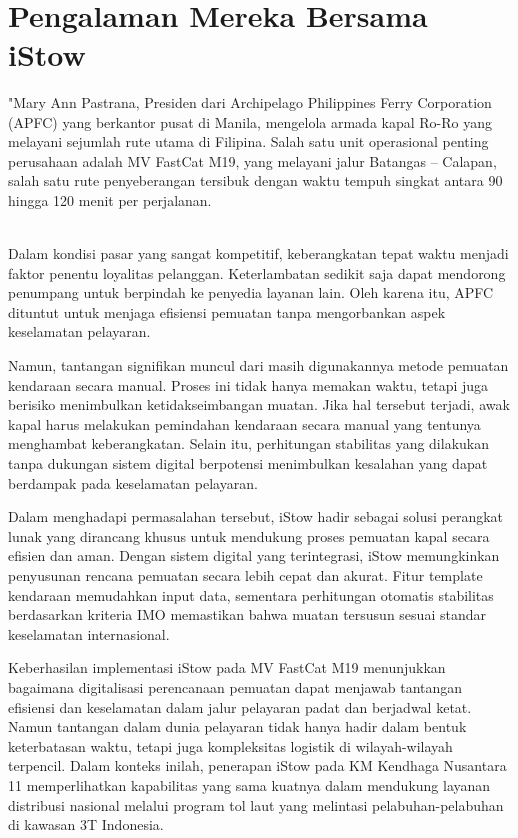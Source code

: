 {
\\
}

\section{Pengalaman Mereka Bersama iStow}
\label{sec:iStow-sebagai-solusi}

"Mary Ann Pastrana, Presiden dari Archipelago Philippines Ferry Corporation (APFC) yang berkantor pusat di Manila, mengelola armada kapal Ro-Ro yang melayani sejumlah rute utama di Filipina. Salah satu unit operasional penting perusahaan adalah MV FastCat M19, yang melayani jalur Batangas – Calapan, salah satu rute penyeberangan tersibuk dengan waktu tempuh singkat antara 90 hingga 120 menit per perjalanan.\\

{
\\
}

Dalam kondisi pasar yang sangat kompetitif, keberangkatan tepat waktu menjadi faktor penentu loyalitas pelanggan. Keterlambatan sedikit saja dapat mendorong penumpang untuk berpindah ke penyedia layanan lain. Oleh karena itu, APFC dituntut untuk menjaga efisiensi pemuatan tanpa mengorbankan aspek keselamatan pelayaran.

Namun, tantangan signifikan muncul dari masih digunakannya metode pemuatan kendaraan secara manual. Proses ini tidak hanya memakan waktu, tetapi juga berisiko menimbulkan ketidakseimbangan muatan. Jika hal tersebut terjadi, awak kapal harus melakukan pemindahan kendaraan secara manual yang tentunya menghambat keberangkatan. Selain itu, perhitungan stabilitas yang dilakukan tanpa dukungan sistem digital berpotensi menimbulkan kesalahan yang dapat berdampak pada keselamatan pelayaran.

Dalam menghadapi permasalahan tersebut, iStow hadir sebagai solusi perangkat lunak yang dirancang khusus untuk mendukung proses pemuatan kapal secara efisien dan aman. Dengan sistem digital yang terintegrasi, iStow memungkinkan penyusunan rencana pemuatan secara lebih cepat dan akurat. Fitur template kendaraan memudahkan input data, sementara perhitungan otomatis stabilitas berdasarkan kriteria IMO memastikan bahwa muatan tersusun sesuai standar keselamatan internasional.

Keberhasilan implementasi iStow pada MV FastCat M19 menunjukkan bagaimana digitalisasi perencanaan pemuatan dapat menjawab tantangan efisiensi dan keselamatan dalam jalur pelayaran padat dan berjadwal ketat. Namun tantangan dalam dunia pelayaran tidak hanya hadir dalam bentuk keterbatasan waktu, tetapi juga kompleksitas logistik di wilayah-wilayah terpencil. Dalam konteks inilah, penerapan iStow pada KM Kendhaga Nusantara 11 memperlihatkan kapabilitas yang sama kuatnya dalam mendukung layanan distribusi nasional melalui program tol laut yang melintasi pelabuhan-pelabuhan di kawasan 3T Indonesia.

